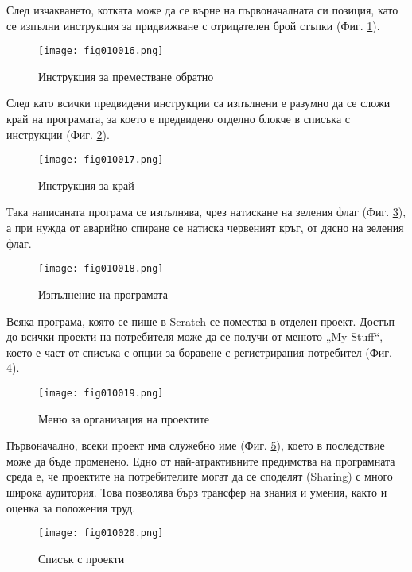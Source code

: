 След изчакването, котката може да се върне на първоначалната си позиция, като се изпълни инструкция за придвижване с отрицателен брой стъпки (Фиг. \ref{fig010016}).

\begin{figure}[H]
  \centering
  \texttt{[image: fig010016.png]}
  \caption{Инструкция за преместване обратно}
\label{fig010016}
\end{figure}

След като всички предвидени инструкции са изпълнени е разумно да се сложи край на програмата, за което е предвидено отделно блокче в списъка с инструкции (Фиг. \ref{fig010017}).

\begin{figure}[H]
  \centering
  \texttt{[image: fig010017.png]}
  \caption{Инструкция за край}
\label{fig010017}
\end{figure}

Така написаната програма се изпълнява, чрез натискане на зеления флаг (Фиг. \ref{fig010018}), а при нужда от аварийно спиране се натиска червеният кръг, от дясно на зеления флаг.

\begin{figure}[H]
  \centering
  \texttt{[image: fig010018.png]}
  \caption{Изпълнение на програмата}
\label{fig010018}
\end{figure}

Всяка програма, която се пише в Scratch се помества в отделен проект. Достъп до всички проекти на потребителя може да се получи от менюто „My Stuff“, което е част от списъка с опции за боравене с регистрирания потребител (Фиг. \ref{fig010019}).

\begin{figure}[H]
  \centering
  \texttt{[image: fig010019.png]}
  \caption{Меню за организация на проектите}
\label{fig010019}
\end{figure}

Първоначално, всеки проект има служебно име (Фиг. \ref{fig010020}), което в последствие може да бъде променено. Едно от най-атрактивните предимства на програмната среда е, че проектите на потребителите могат да се споделят (Sharing) с много широка аудитория. Това позволява бърз трансфер на знания и умения, както и оценка за положения труд. 

\begin{figure}[H]
  \centering
  \texttt{[image: fig010020.png]}
  \caption{Списък с проекти}
\label{fig010020}
\end{figure}

